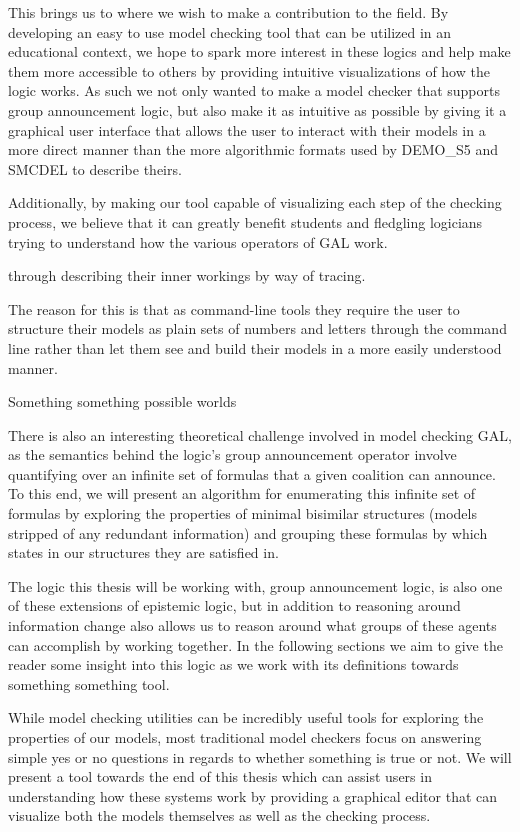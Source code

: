 
This brings us to where we wish to make a contribution to the field. By developing an easy to use model checking tool that can be utilized in an educational context, we hope to spark more interest in these logics and help make them more accessible to others by providing intuitive visualizations of how the logic works. As such we not only wanted to make a model checker that supports group announcement logic, but also make it as intuitive as possible by giving it a graphical user interface that allows the user to interact with their models in a more direct manner than the more algorithmic formats used by DEMO\_S5 and SMCDEL to describe theirs.

Additionally, by making our tool capable of visualizing each step of the checking process, we believe that it can greatly benefit students and fledgling logicians trying to understand how the various operators of GAL work. 

through describing their inner workings by way of tracing.


The reason for this is that as command-line tools they require the user to structure their models as plain sets of numbers and letters through the command line rather than let them see and build their models in a more easily understood manner. 


Something something possible worlds

There is also an interesting theoretical challenge involved in model checking GAL, as the semantics behind the logic's group announcement operator involve quantifying over an infinite set of formulas that a given coalition can announce. To this end, we will present an algorithm for enumerating this infinite set of formulas by exploring the properties of minimal bisimilar structures (models stripped of any redundant information) and grouping these formulas by which states in our structures they are satisfied in. 


The logic this thesis will be working with, group announcement logic, is also one of these extensions of epistemic logic, but in addition to reasoning around information change also allows us to reason around what groups of these agents can accomplish by working together. In the following sections we aim to give the reader some insight into this logic as we work with its definitions towards something something tool.

While model checking utilities can be incredibly useful tools for exploring the properties of our models, most traditional model checkers focus on answering simple yes or no questions in regards to whether something is true or not. We will present a tool towards the end of this thesis which can assist users in understanding how these systems work by providing a graphical editor that can visualize both the models themselves as well as the checking process.

